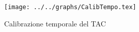 \begin{figure}[h] \centering\texttt{[image: ../../graphs/CalibTempo.tex]}\caption{Calibrazione temporale del TAC}\label{gr:CalibTempo} \end{figure}
